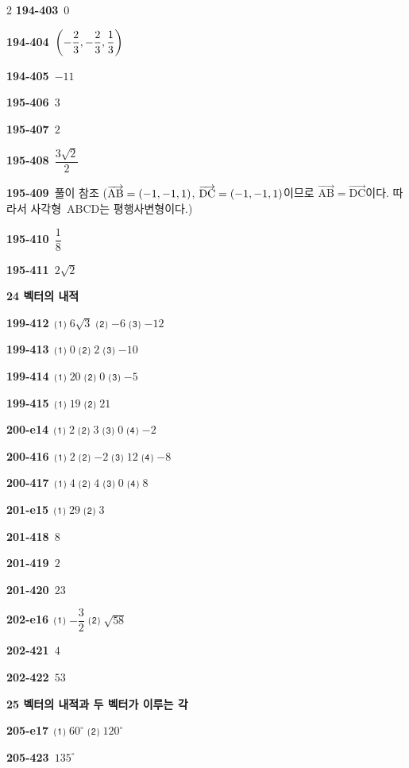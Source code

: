 \documentclass[10pt,a4paper]{article}
\newcommand{\pt}[1]{\mathrm{#1}}
\newcommand{\vecAB}[1]{\overrightarrow{\mathrm{#1}}}
\begin{document}
\begin{multicols}{2}
\noindent\textbf{194-403}\ $0$\par
\noindent\textbf{194-404}\ $\left(-\dfrac{2}{3}{,}\mkern3mu\mathopen{}-\dfrac{2}{3}{,}\mkern3mu\mathopen{}\dfrac{1}{3}\right)$\par
\noindent\textbf{194-405}\ $-11$\par
\noindent\textbf{195-406}\ $3$\par
\noindent\textbf{195-407}\ $2$\par
\noindent\textbf{195-408}\ $\dfrac{3\sqrt{2}}{2}$\par
\noindent\textbf{195-409}\ 풀이 참조 ($\vecAB{AB}=(-1{,}\mkern3mu\mathopen{}-1{,}\mkern3mu\mathopen{}1)$, $\vecAB{DC}=(-1{,}\mkern3mu\mathopen{}-1{,}\mkern3mu\mathopen{}1)$이므로 $\vecAB{AB}=\vecAB{DC}$이다. 따라서 사각형~$\pt{ABCD}$는 평행사변형이다.)\par
\noindent\textbf{195-410}\ $\dfrac{1}{8}$\par
\noindent\textbf{195-411}\ $2\sqrt{2}$\par
\noindent\textbf{24 벡터의 내적}\par\smallskip
\noindent\textbf{199-412}\ ⑴ $6\sqrt{3}$ ⑵ $-6$ ⑶ $-12$\par
\noindent\textbf{199-413}\ ⑴ $0$ ⑵ $2$ ⑶ $-10$\par
\noindent\textbf{199-414}\ ⑴ $20$ ⑵ $0$ ⑶ $-5$\par
\noindent\textbf{199-415}\ ⑴ $19$ ⑵ $21$\par
\noindent\textbf{200-e14}\ ⑴ $2$ ⑵ $3$ ⑶ $0$ ⑷ $-2$\par
\noindent\textbf{200-416}\ ⑴ $2$ ⑵ $-2$ ⑶ $12$ ⑷ $-8$\par
\noindent\textbf{200-417}\ ⑴ $4$ ⑵ $4$ ⑶ $0$ ⑷ $8$\par
\noindent\textbf{201-e15}\ ⑴ $29$ ⑵ $3$\par
\noindent\textbf{201-418}\ $8$\par
\noindent\textbf{201-419}\ $2$\par
\noindent\textbf{201-420}\ $23$\par
\noindent\textbf{202-e16}\ ⑴ $-\dfrac{3}{2}$ ⑵ $\sqrt{58}$\par
\noindent\textbf{202-421}\ $4$\par
\noindent\textbf{202-422}\ $53$\par
\noindent\textbf{25 벡터의 내적과 두 벡터가 이루는 각}\par\smallskip
\noindent\textbf{205-e17}\ ⑴ $60^\circ$ ⑵ $120^\circ$\par
\noindent\textbf{205-423}\ $135^\circ$\par

\end{multicols}
\end{document}
